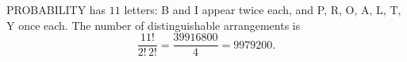 PROBABILITY has $11$ letters: B and I appear twice each, and P, R, O, A, L, T, Y once each. The number of distinguishable arrangements is
\[\dfrac{11!}{2!\,2!}=\dfrac{39916800}{4}=\boxed{9979200}.\]
